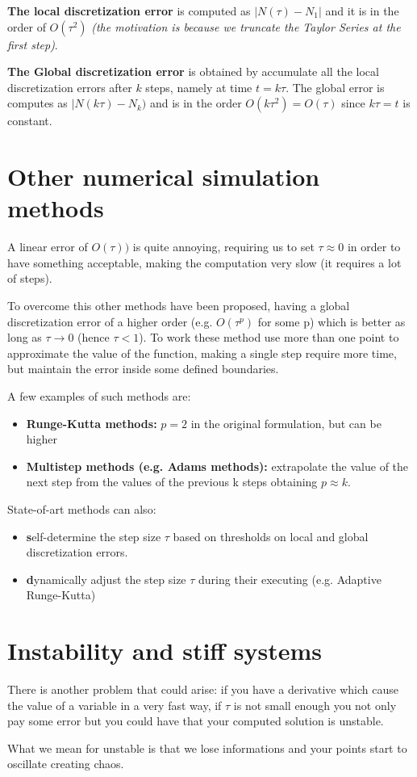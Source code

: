 \textbf{The local discretization error} is computed as $| N(\tau) - N_1|$ and it is in the order of $O(\tau^2)$ \textit{(the motivation is because we truncate the Taylor Series at the first step)}.\par

\textbf{The Global discretization error} is obtained by accumulate all the local discretization errors after $k$ steps, namely at time $t = k \tau$. The global error is computes as $|N(k \tau) - N_k)$ and is in the order $O(k \tau^2) = O(\tau)$ since $k \tau = t$ is constant.

\section {Other numerical simulation methods}
A linear error of $O(\tau))$ is quite annoying, requiring us to set $\tau \approx 0$ in order to have something acceptable, making the computation very slow (it requires a lot of steps).\par
To overcome this other methods have been proposed, having a global discretization error of a higher order (e.g. $O(\tau^p)$ for some p) which is better as long as $\tau \rightarrow 0$ (hence $\tau < 1$). To work these method use more than one point to approximate the value of the function, making a single step require more time, but maintain the error inside some defined boundaries. \par

A few examples of such methods are:
\begin{itemize}
    \item \textbf{Runge-Kutta methods:} $p = 2$ in the original formulation, but can be higher
    \item \textbf{Multistep methods (e.g. Adams methods):} extrapolate the value of the next step from the values of the previous k steps obtaining $p \approx k$.
\end{itemize}

State-of-art methods can also:
\begin{itemize}
    \item \textbf self-determine the step size $\tau$ based on thresholds on local and global discretization errors.
    \item \textbf dynamically adjust the step size $\tau$ during their executing (e.g. Adaptive Runge-Kutta) 
\end{itemize}

\section{Instability and stiff systems}
There is another problem that could arise: if you have a derivative which cause the value of a variable in a very fast way, if $\tau$ is not small enough you not only pay some error but you could have that your computed solution is unstable.\par
What we mean for unstable is that we lose informations and your points start to oscillate creating chaos.\par

